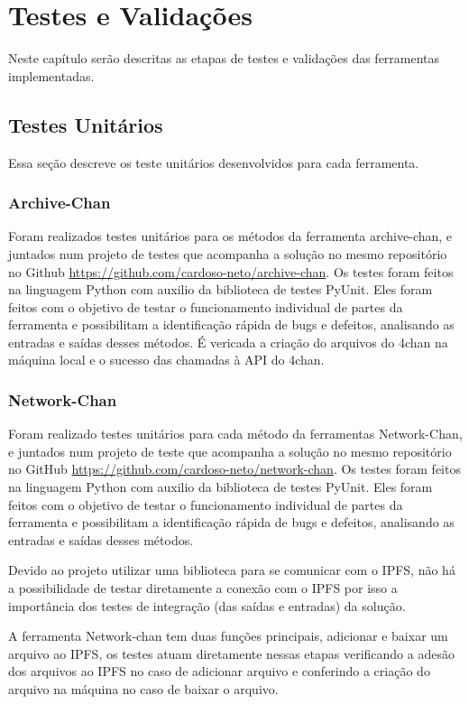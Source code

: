 \chapter{Testes e Validações}

Neste capítulo serão descritas as etapas de testes e validações das ferramentas implementadas.

\section{Testes Unitários}

Essa seção descreve os teste unitários desenvolvidos para cada ferramenta.

\subsection{Archive-Chan}
Foram realizados testes unitários para os métodos da ferramenta archive-chan, e juntados num projeto de testes que acompanha a solução no mesmo repositório no Github \url{https://github.com/cardoso-neto/archive-chan}.
Os testes foram feitos na linguagem Python com auxilio da biblioteca de testes PyUnit.
Eles foram feitos com o objetivo de testar o funcionamento individual de partes da ferramenta e possibilitam a identificação rápida de bugs e defeitos, analisando as entradas e saídas desses métodos.
É vericada a criação do arquivos do 4chan na máquina local e o sucesso das chamadas à API do 4chan.

\subsection{Network-Chan}

Foram realizado testes unitários para cada método da ferramentas Network-Chan, e juntados num projeto de teste que acompanha a solução no mesmo repositório no GitHub \url{https://github.com/cardoso-neto/network-chan}.
Os testes foram feitos na linguagem Python com auxilio da biblioteca de testes PyUnit.
Eles foram feitos com o objetivo de testar o funcionamento individual de partes da ferramenta e possibilitam a identificação rápida de bugs e defeitos, analisando as entradas e saídas desses métodos.

Devido ao projeto utilizar uma biblioteca para se comunicar com o IPFS, não há a possibilidade de testar diretamente a conexão com o IPFS por isso a importância dos testes de integração (das saídas e entradas) da solução. 

A ferramenta Network-chan tem duas funções principais, adicionar e baixar um arquivo ao IPFS, os testes atuam diretamente nessas etapas verificando a adesão dos arquivos ao IPFS no caso de adicionar arquivo e conferindo a criação do arquivo na máquina no caso de baixar o arquivo.

